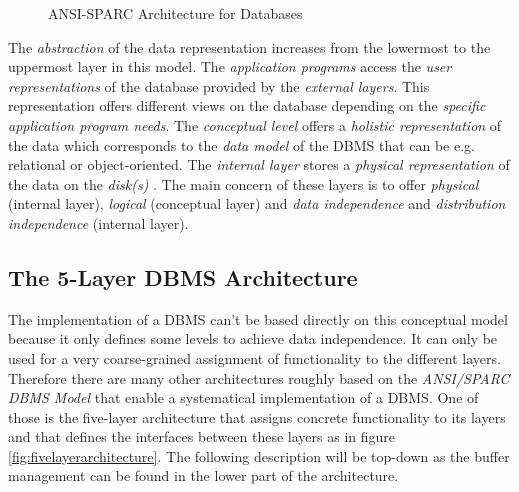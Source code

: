 \begin{@empty}
\begin{figure}[ht!]
{
		}
        \vspace{.75em}
		\caption{ANSI-SPARC Architecture for Databases}
		\label{fig:ansisparcarchitecture}
	\end{figure}
\end{@empty}

    The \emph{abstraction} of the data representation increases from the lowermost to the uppermost layer in this model. The \emph{application programs} access the \emph{user representations} of the database provided by the \emph{external layers}. This representation offers different views on the database depending on the \emph{specific application program needs}. The \emph{conceptual level} offers a \emph{holistic representation} of the data which corresponds to the \emph{data model} of the DBMS that can be e.g. relational or object-oriented. The \emph{internal layer} stores a \emph{physical representation} of the data on the \emph{disk(s)} \cite{udemy_ANSI-SPARC}. The main concern of these layers is to offer \emph{physical} (internal layer), \emph{logical} (conceptual layer) and \emph{data independence} and \emph{distribution independence} (internal layer).

\subsection[5-Layer DBMS Architecture]{The 5-Layer DBMS Architecture}

    The implementation of a DBMS can't be based directly on this conceptual model because it only defines some levels to achieve data independence. It can only be used for a very coarse-grained assignment of functionality to the different layers. Therefore there are many other architectures roughly based on the \emph{ANSI/SPARC DBMS Model} that enable a systematical implementation of a DBMS. One of those is the five-layer architecture \cite{Haerder:1983} \cite{Haerder:1985} that assigns concrete functionality to its layers and that defines the interfaces between these layers as in figure \ref{fig:fivelayerarchitecture}. The following description will be top-down as the buffer management can be found in the lower part of the architecture.

